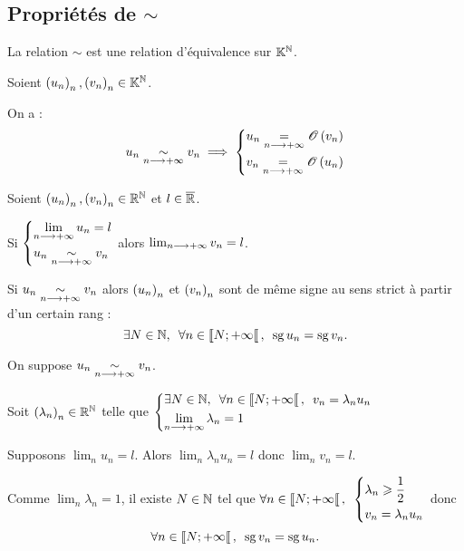 \subsection{Propriétés de \(\sim\)}

\begin{prop}
La relation \(\sim\) est une relation d'équivalence sur \(\mathbb{K}^{\mathbb{N}}\).
\end{prop}

\begin{prop}
Soient \(\left(u_n\right)_n,\left(v_n\right)_n\in\mathbb{K}^{\mathbb{N}}\).

On a : \[u_n\underset{n\longrightarrow+\infty}{\sim}v_n\implies\begin{dcases}
u_n\underset{n\longrightarrow+\infty}{=}\mathscr{O}\left(v_n\right) \\
v_n\underset{n\longrightarrow+\infty}{=}\mathscr{O}\left(u_n\right)
\end{dcases}\]
\end{prop}

\begin{prop}
Soient \(\left(u_n\right)_n,\left(v_n\right)_n\in\mathbb{R}^{\mathbb{N}}\) et \(l\in\overline{\mathbb{R}}\).

Si \(\begin{dcases}
\lim_{n\longrightarrow+\infty}u_n=l \\
u_n\underset{n\longrightarrow+\infty}{\sim}v_n
\end{dcases}\) alors \(\lim_{n\longrightarrow+\infty}v_n=l\).

Si \(u_n\underset{n\longrightarrow+\infty}{\sim}v_n\) alors \(\left(u_n\right)_n\) et \(\left(v_n\right)_n\) sont de même signe au sens strict à partir d'un certain rang : \[\quantifs{\exists N\in\N;\forall n\in\interventierie{N}{\pinf}}\sg u_n=\sg v_n.\]
\end{prop}

\begin{dem}
On suppose \(u_n\underset{n\longrightarrow+\infty}{\sim}v_n\).

Soit \(\left(\lambda_n\right)_n\in\mathbb{R}^{\mathbb{N}}\) telle que \(\begin{dcases}
\quantifs{\exists N\in\N;\forall n\in\interventierie{N}{\pinf}}v_n=\lambda_nu_n \\
\lim_{n\to\pinf}\lambda_n=1
\end{dcases}\)

Supposons \(\lim_nu_n=l\). Alors \(\lim_n\lambda_nu_n=l\) donc \(\lim_nv_n=l\).

Comme \(\lim_n\lambda_n=1\), il existe \(N\in\mathbb{N}\) tel que \(\quantifs{\forall n\in\interventierie{N}{\pinf}}\begin{dcases}
\lambda_n\geq\dfrac{1}{2} \\
v_n=\lambda_nu_n
\end{dcases}\) donc \[\quantifs{\forall n\in\interventierie{N}{\pinf}}\sg v_n=\sg u_n.\]
\end{dem}


